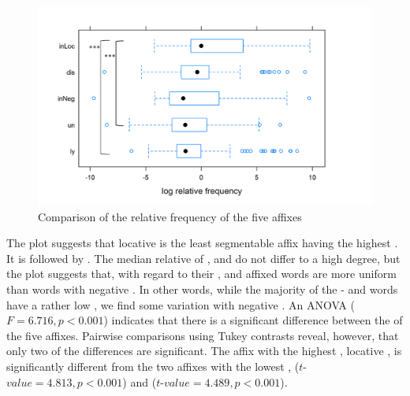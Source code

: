 \begin{figure}  
	
	\includegraphics[scale=0.5]{images/Corpus/corpusComparisonRelFreq2.png}
	\caption{ Comparison of the relative frequency of the five affixes }
	\label{fig: corpus RelFreq comparison}

\end{figure}


The plot suggests that locative  is the least segmentable affix having the highest . It is followed by . The median relative  of ,  and  do not differ to a high degree, but the plot suggests that, with regard to their ,  and affixed words are more uniform than words with negative . In other words, while the majority of the - and words have a rather low , we find some variation with negative . 
 An ANOVA ($F=6.716 ,p<0.001$) indicates that there is a significant difference between the  of the five affixes. Pairwise comparisons using Tukey contrasts reveal, however, that only two of the differences are significant. The affix with the highest , locative , is significantly different from the two affixes with the lowest ,  ($t$-$value=4.813, p<0.001$)  and  ($t$-$value=4.489, p<0.001$). 

            

